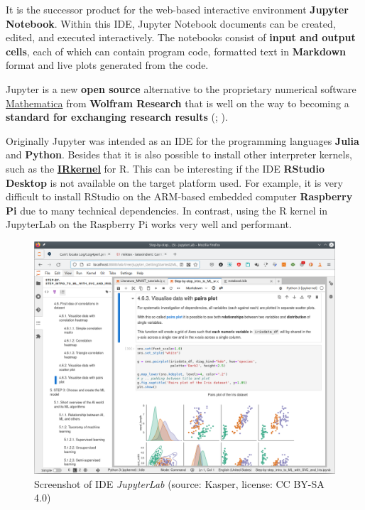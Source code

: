 \documentclass [oneside,10pt,a4paper,ngerman,BCOR10mm,headsepline,parindent,final]{scrartcl}
\begin{document}
It is the successor product for the web-based interactive environment
\textbf{Jupyter Notebook}. Within this IDE, Jupyter Notebook documents
can be created, edited, and executed interactively. The notebooks
consist of \textbf{input and output cells}, each of which can contain
program code, formatted text in \textbf{Markdown} format and live plots
generated from the code.

Jupyter is a new \textbf{open source} alternative to the proprietary
numerical software
\href{https://en.wikipedia.org/wiki/Wolfram_Mathematica}{Mathematica}
from \textbf{Wolfram Research} that is well on the way to becoming a
\textbf{standard for exchanging research results}
(\cite{Scientific_Paper_obsolete_2018};
\cite{Future_of_Research_Paper_2018}).

Originally Jupyter was intended as an IDE for the programming languages
\textbf{Julia} and \textbf{Python}. Besides that it is also possible to
install other interpreter kernels, such as the
\textbf{\href{https://irkernel.github.io/installation/}{IRkernel}} for
R. This can be interesting if the IDE \textbf{RStudio Desktop} is not
available on the target platform used. For example, it is very difficult
to install RStudio on the ARM-based embedded computer \textbf{Raspberry
Pi} due to many technical dependencies. In contrast, using the R kernel
in JupyterLab on the Raspberry Pi works very well and performant.

\begin{figure}
\centering
\includegraphics{images/Screenshot_JupyterLab.png}
\caption{Screenshot of IDE \emph{JupyterLab} (source: Kasper, license:
CC BY-SA 4.0)}
\end{figure}
\end{document}
